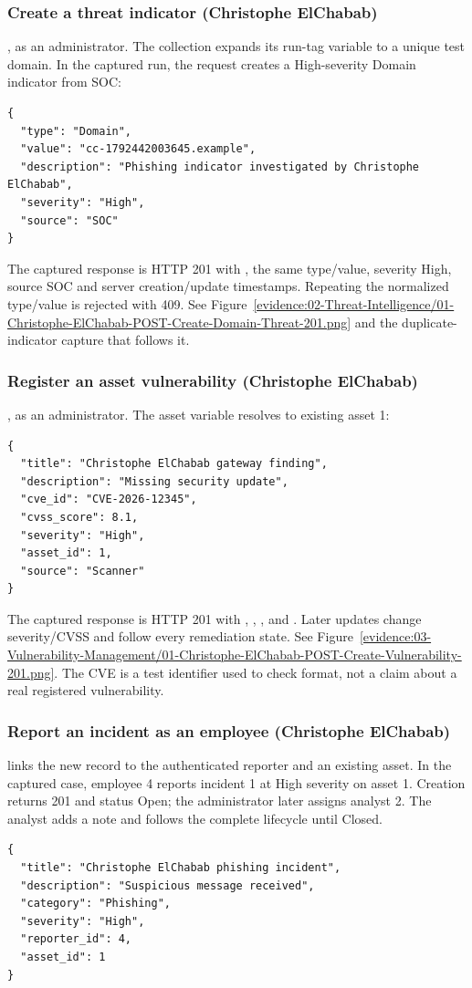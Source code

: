 \subsubsection{Create a threat indicator (Christophe ElChabab)}
, as an administrator. The collection expands its run-tag variable to a unique test domain. In the captured run, the request creates a High-severity Domain indicator from SOC:
\begin{lstlisting}
{
  "type": "Domain",
  "value": "cc-1792442003645.example",
  "description": "Phishing indicator investigated by Christophe ElChabab",
  "severity": "High",
  "source": "SOC"
}
\end{lstlisting}
The captured response is HTTP 201 with , the same type/value, severity High, source SOC and server creation/update timestamps. Repeating the normalized type/value is rejected with 409. See Figure~\ref{evidence:02-Threat-Intelligence/01-Christophe-ElChabab-POST-Create-Domain-Threat-201.png} and the duplicate-indicator capture that follows it.

\subsubsection{Register an asset vulnerability (Christophe ElChabab)}
, as an administrator. The asset variable resolves to existing asset 1:
\begin{lstlisting}
{
  "title": "Christophe ElChabab gateway finding",
  "description": "Missing security update",
  "cve_id": "CVE-2026-12345",
  "cvss_score": 8.1,
  "severity": "High",
  "asset_id": 1,
  "source": "Scanner"
}
\end{lstlisting}
The captured response is HTTP 201 with , , ,  and . Later updates change severity/CVSS and follow every remediation state. See Figure~\ref{evidence:03-Vulnerability-Management/01-Christophe-ElChabab-POST-Create-Vulnerability-201.png}. The CVE is a test identifier used to check format, not a claim about a real registered vulnerability.

\subsubsection{Report an incident as an employee (Christophe ElChabab)}
 links the new record to the authenticated reporter and an existing asset. In the captured case, employee 4 reports incident 1 at High severity on asset 1. Creation returns 201 and status Open; the administrator later assigns analyst 2. The analyst adds a note and follows the complete lifecycle until Closed.
\begin{lstlisting}
{
  "title": "Christophe ElChabab phishing incident",
  "description": "Suspicious message received",
  "category": "Phishing",
  "severity": "High",
  "reporter_id": 4,
  "asset_id": 1
}
\end{lstlisting}

